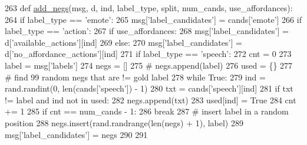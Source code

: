 \begin{DoxyCode}
263 \textcolor{keyword}{def }\hyperlink{namespaceparlai_1_1tasks_1_1light__dialog_1_1builder_a2f5cb4927740a90c9fba84df5e8e16b5}{add\_negs}(msg, d, ind, label\_type, split, num\_cands, use\_affordances):
264     \textcolor{keywordflow}{if} label\_type == \textcolor{stringliteral}{'emote'}:
265         msg[\textcolor{stringliteral}{'label\_candidates'}] = cands[\textcolor{stringliteral}{'emote'}]
266     \textcolor{keywordflow}{if} label\_type == \textcolor{stringliteral}{'action'}:
267         \textcolor{keywordflow}{if} use\_affordances:
268             msg[\textcolor{stringliteral}{'label\_candidates'}] = d[\textcolor{stringliteral}{'available\_actions'}][ind]
269         \textcolor{keywordflow}{else}:
270             msg[\textcolor{stringliteral}{'label\_candidates'}] = d[\textcolor{stringliteral}{'no\_affordance\_actions'}][ind]
271     \textcolor{keywordflow}{if} label\_type == \textcolor{stringliteral}{'speech'}:
272         cnt = 0
273         label = msg[\textcolor{stringliteral}{'labels'}]
274         negs = []
275         \textcolor{comment}{# negs.append(label)}
276         used = \{\}
277         \textcolor{comment}{# find 99 random negs that are != gold label}
278         \textcolor{keywordflow}{while} \textcolor{keyword}{True}:
279             ind = rand.randint(0, len(cands[\textcolor{stringliteral}{'speech'}]) - 1)
280             txt = cands[\textcolor{stringliteral}{'speech'}][ind]
281             \textcolor{keywordflow}{if} txt != label \textcolor{keywordflow}{and} ind \textcolor{keywordflow}{not} \textcolor{keywordflow}{in} used:
282                 negs.append(txt)
283                 used[ind] = \textcolor{keyword}{True}
284                 cnt += 1
285                 \textcolor{keywordflow}{if} cnt == num\_cands - 1:
286                     \textcolor{keywordflow}{break}
287         \textcolor{comment}{# insert label in a random position}
288         negs.insert(rand.randrange(len(negs) + 1), label)
289         msg[\textcolor{stringliteral}{'label\_candidates'}] = negs
290 
291 
\end{DoxyCode}
\mbox{\label{namespaceparlai_1_1tasks_1_1light__dialog_1_1builder_a6a049254e487c29d008f875476ffd76f}} 
